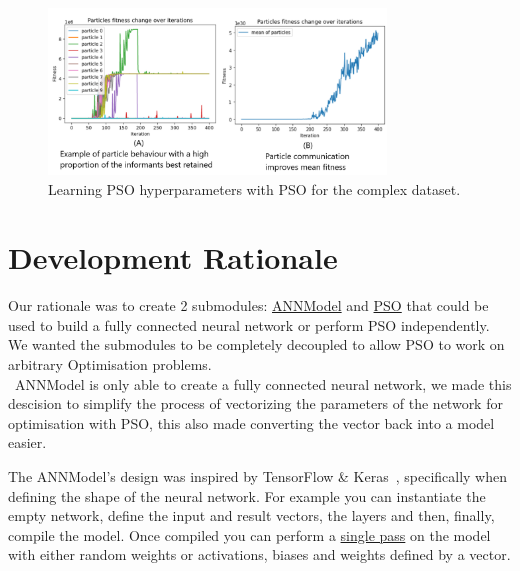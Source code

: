 \documentclass[12pt]{article}
\begin{document}
\begin{figure}[H]
    \begin{center}
        \includegraphics[width=0.8\textwidth]{Examples.png} 
    \end{center}
    
    \caption{Learning PSO hyperparameters with PSO for the complex dataset.}
    \label{fig:ExamplePlots}   
\end{figure}

\section{Development Rationale}
Our rationale was to create 2 submodules: \href{https://www2.macs.hw.ac.uk/~sf52/Bio-Comp-docs/html/Coursework.ANNModel.html}{ANNModel} and \href{https://www2.macs.hw.ac.uk/~sf52/Bio-Comp-docs/html/Coursework.PSO.html}{PSO} that could be used to build a fully connected neural network or perform PSO independently.
We wanted the submodules to be completely decoupled to allow PSO to work on arbitrary Optimisation problems.\\

\noindent~ANNModel is only able to create a fully connected neural network, we made this descision to simplify the process of vectorizing the parameters of the network for optimisation with PSO, this also made converting the vector back into a model easier.

The ANNModel’s design was inspired by TensorFlow \& Keras~\autocite{kerasKerasDocumentationModel,tensorflowModuleTfKeras}, specifically when defining the shape of the neural network. For example you can instantiate the empty network, define the input and result vectors, the layers and then, finally, compile the model.
Once compiled you can perform a \href{https://www2.macs.hw.ac.uk/~sf52/Bio-Comp-docs/html/Coursework.ANNModel.html?highlight=one_pass#Coursework.ANNModel.model.ANN.one_pass}{single pass} on the model with either random weights or activations, biases and weights defined by a vector.\\
\end{document}

